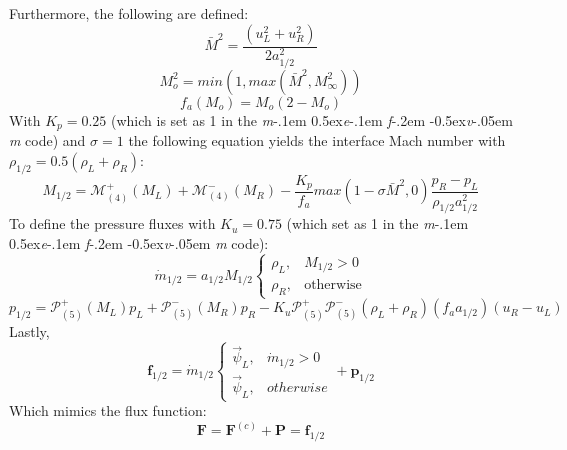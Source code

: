 \documentclass[a4paper, 12pt]{article}
\newcommand\mefvm{%
    \textit{m}\kern-.1em%
    \raise0.5ex\hbox{\textit{e}}\kern-.1em%
    \textit{f}\kern-.2em%
    \raise-0.5ex\hbox{\textit{v}}\kern-.05em%
    \textit{m}
}
\begin{document}
Furthermore, the following are defined:
\begin{equation}
    \bar M^2 = \dfrac{(u_L^2+u_R^2)}{2a^2_{1/2}}
\end{equation}
\begin{equation}
    M_o^2 = min(1, max(\bar M^2, M_\infty^2))
\end{equation}
\begin{equation}
    f_a(M_o) = M_o(2-M_o)
\end{equation}
With $K_p = 0.25$ (which is set as 1 in the \mefvm code) and $\sigma=1$ the following equation yields the interface Mach number with $\rho_{1/2}=0.5(\rho_L+\rho_R)$:
\begin{equation}
    M_{1/2}=\mathscr{M}^+_{(4)}(M_L)+\mathscr{M}^-_{(4)}(M_R)-\dfrac{K_p}{f_a}max(1-\sigma \bar M^2,0)\dfrac{p_R-p_L}{\rho_{1/2}a^2_{1/2}}
\end{equation}
To define the pressure fluxes with $K_u=0.75$ (which set as 1 in the \mefvm code):
\begin{equation}
    \dot m_{1/2}=a_{1/2}M_{1/2}
    \begin{cases}
        \rho_L ,& M_{1/2}>0\\
        \rho_R ,& \text{otherwise}
    \end{cases}
\end{equation}
\begin{equation}
    p_{1/2}=\mathscr{P}^+_{(5)}(M_L)p_L + \mathscr{P}^-_{(5)}(M_R)p_R - K_u\mathscr{P}^+_{(5)}\mathscr{P}^-_{(5)}(\rho_L+\rho_R)(f_aa_{1/2})(u_R-u_L)
\end{equation}
Lastly,
\begin{equation}
    \textbf{f}_{1/2}=\dot m_{1/2}
    \begin{cases}
        \vec{\psi}_L, & \dot m_{1/2}>0\\
        \vec{\psi}_L, & otherwise
    \end{cases}
    + \textbf{p}_{1/2}
\end{equation}
Which mimics the flux function:
\begin{equation}
    \textbf{F}=\textbf{F}^{(c)}+\textbf{P}=\textbf{f}_{1/2}
\end{equation}
\end{document}
